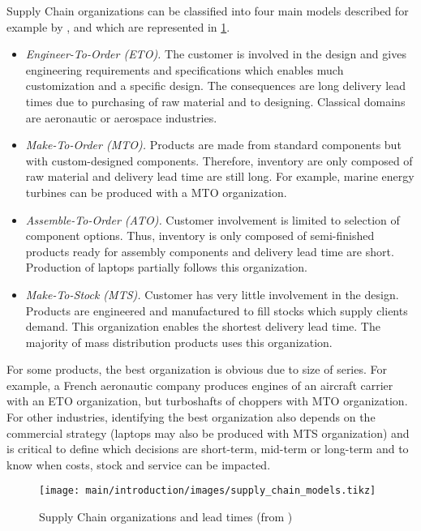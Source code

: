 Supply Chain organizations can be classified into four main models described for example by \citet{Arnold2007}, and which are represented in \cref{fig:supply-chain-models}.
\begin{itemize}
  \item \emph{Engineer-To-Order (ETO).}
  The customer is involved in the design and gives engineering requirements and specifications which enables much customization and a specific design.
  The consequences are long delivery lead times due to purchasing of raw material and to designing.
  Classical domains are aeronautic or aerospace industries.
  \item \emph{Make-To-Order (MTO).}
  Products are made from standard components but with custom-designed components.
  Therefore, inventory are only composed of raw material and delivery lead time are still long.
  For example, marine energy turbines can be produced with a MTO organization.
  \item \emph{Assemble-To-Order (ATO).}
  Customer involvement is limited to selection of component options.
  Thus, inventory is only composed of semi-finished products ready for assembly components and delivery lead time are short.
  Production of laptops partially follows this organization.
  \item \emph{Make-To-Stock (MTS).}
  Customer has very little involvement in the design.
  Products are engineered and manufactured to fill stocks which supply clients demand.
  This organization enables the shortest delivery lead time.
  The majority of mass distribution products uses this organization.
\end{itemize}
For some products, the best organization is obvious due to size of series.
For example, a French aeronautic company produces engines of an aircraft carrier with an ETO organization, but turboshafts of choppers with MTO organization.
For other industries, identifying the best organization also depends on the commercial strategy (laptops may also be produced with MTS organization) and is critical to define which decisions are short-term, mid-term or long-term and to know when costs, stock and service can be impacted.


\begin{figure}[h]
  \centering
  \texttt{[image: main/introduction/images/supply\_chain\_models.tikz]}
  \caption{Supply Chain organizations and lead times (from \citet{Arnold2007})}
  \label{fig:supply-chain-models}
\end{figure}


